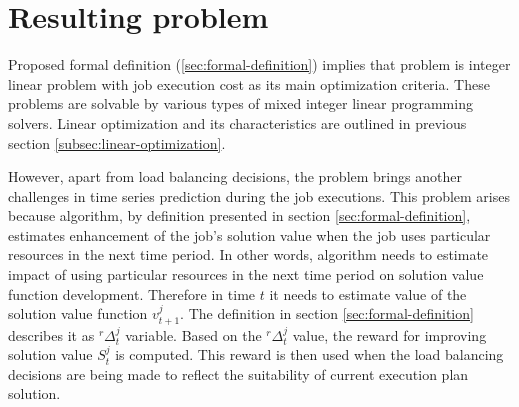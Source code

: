 \section{Resulting problem}\label{sec:resulting-problem}
Proposed formal definition (\ref{sec:formal-definition}) implies that problem is 
integer linear problem with job execution cost as its main optimization criteria. 
These problems are solvable by various types of mixed integer linear programming solvers.
Linear optimization and its characteristics are outlined in previous section \ref{subsec:linear-optimization}.

However,
apart from load balancing decisions,
the problem brings another challenges in time series prediction during the job executions.
This problem arises because algorithm, by definition presented in section \ref{sec:formal-definition},
estimates enhancement of the job's solution value when the job uses particular resources in the next time period.
In other words, 
algorithm needs to estimate impact of using particular resources in the next time period on solution value function development.
Therefore in time $t$ it needs to estimate value of the solution value function $v_{t+1}^{j}$.
The definition in section \ref{sec:formal-definition} describes it as $^{r}\Delta_{t}^{j}$ variable.
Based on the $^{r}\Delta_{t}^{j}$ value, the reward for improving solution value $S_{t}^{j}$ is computed.
This reward is then used when the load balancing decisions are being made to reflect the suitability of current execution plan solution.